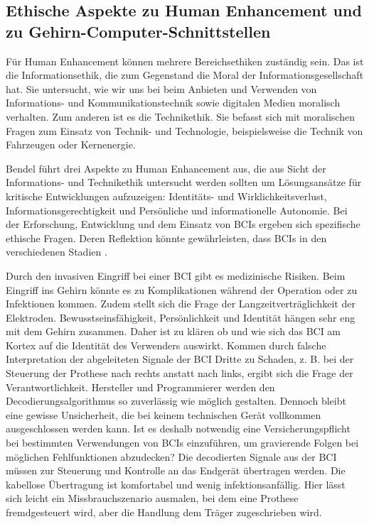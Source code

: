 \documentclass[11pt,ngerman,parskip=half]{scrartcl}
\begin{document}
\subsection{Ethische Aspekte zu Human Enhancement und zu Gehirn-Computer-Schnittstellen}
\label{subsec:kathrin_ethische_aspekte_zu_human_enhancement_und_zu_gehirn-computer-schnittstellen}
Für Human Enhancement können mehrere Bereichsethiken zuständig sein. Das ist
die Informationsethik, die zum Gegenstand die Moral der
Informationsgesellschaft hat. Sie untersucht, wie wir uns bei beim Anbieten
und Verwenden von Informations- und Kommunikationstechnik sowie digitalen
Medien moralisch verhalten. \parencite[][77--78]{bendel_human_2015}
Zum anderen ist es die Technikethik. Sie befasst sich mit moralischen Fragen
zum Einsatz von Technik- und Technologie, beispielsweise die Technik von
Fahrzeugen oder Kernenergie. \parencite[][78]{bendel_human_2015}

Bendel führt drei Aspekte zu Human Enhancement aus, die aus Sicht der
Informations- und Technikethik untersucht werden sollten um Lösungsansätze
für kritische Entwicklungen aufzuzeigen: Identitäts- und
Wirklichkeitsverlust, Informationsgerechtigkeit und Persönliche und
informationelle Autonomie. \parencite[][78--80]{bendel_human_2015}
Bei der Erforschung, Entwicklung und dem Einsatz von BCIs ergeben sich
spezifische ethische Fragen. Deren Reflektion könnte gewährleisten, dass BCIs
in den verschiedenen Stadien
.

Durch den invasiven Eingriff bei einer BCI gibt es medizinische Risiken. Beim
Eingriff ins Gehirn könnte es zu Komplikationen während der Operation oder zu
Infektionen kommen. Zudem stellt sich die Frage der Langzeitverträglichkeit
der Elektroden. \parencite[][28]{clausen_ethische_2006}
Bewusstseinsfähigkeit, Persönlichkeit und Identität hängen sehr eng mit dem
Gehirn zusammen. Daher ist zu klären ob und wie sich das BCI am Kortex auf
die Identität des Verwenders auswirkt.
\parencite[][28]{clausen_ethische_2006} Kommen durch falsche Interpretation
der abgeleiteten Signale der BCI Dritte zu Schaden, z. B. bei der Steuerung
der Prothese nach rechts anstatt nach links, ergibt sich die Frage der
Verantwortlichkeit. Hersteller und Programmierer werden den
Decodierungsalgorithmus so zuverlässig wie möglich gestalten. Dennoch bleibt
eine gewisse Unsicherheit, die bei keinem technischen Gerät vollkommen
ausgeschlossen werden kann. Ist es deshalb notwendig eine
Versicherungspflicht bei bestimmten Verwendungen von BCIs einzuführen, um
gravierende Folgen bei möglichen Fehlfunktionen abzudecken?
\parencite[][29]{clausen_ethische_2006} Die decodierten Signale aus der BCI
müssen zur Steuerung und Kontrolle an das Endgerät übertragen werden. Die
kabellose Übertragung ist komfortabel und wenig infektionsanfällig. Hier
lässt sich leicht ein Missbrauchszenario ausmalen, bei dem eine Prothese
fremdgesteuert wird, aber die Handlung dem Träger zugeschrieben wird.
\parencite[][30]{clausen_ethische_2006}
\end{document}
